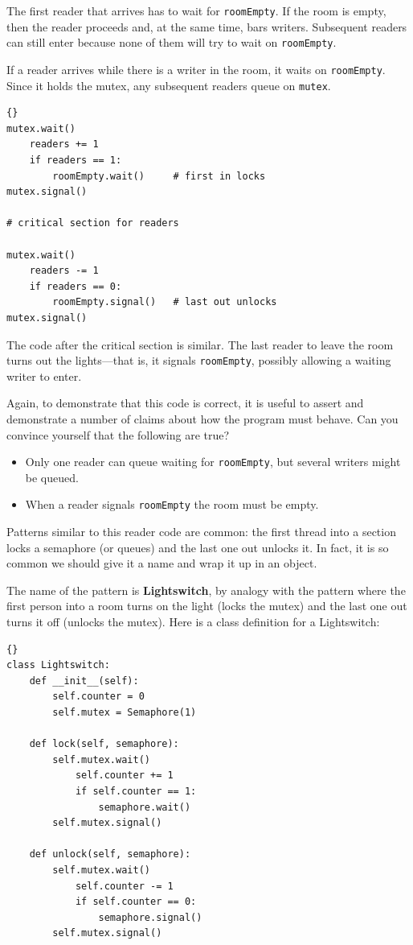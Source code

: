 \documentclass{book}
\begin{document}
The first reader that arrives has to wait for {\tt roomEmpty}.
If the room is empty, then the reader proceeds and, at the
same time, bars writers.  Subsequent readers can still enter
because none of them will try to wait on {\tt roomEmpty}.

If a reader arrives while there is a writer in the room,
it waits on {\tt roomEmpty}.  Since it holds the mutex, any
subsequent readers queue on {\tt mutex}.

\begin{lstlisting}[caption={Readers solution}]{}
mutex.wait()
    readers += 1
    if readers == 1:
        roomEmpty.wait()     # first in locks
mutex.signal()

# critical section for readers

mutex.wait()
    readers -= 1
    if readers == 0:
        roomEmpty.signal()   # last out unlocks
mutex.signal()
\end{lstlisting}

The code after the critical section is similar.  The last reader
to leave the room turns out the lights---that is, it signals
{\tt roomEmpty}, possibly allowing a waiting writer to enter.

Again, to demonstrate that this code is correct, it is useful
to assert and demonstrate a number of claims about how the program
must behave.  Can you convince yourself that the following are
true?

\begin{itemize}

\item Only one reader can queue waiting for {\tt roomEmpty},
but several writers might be queued.

\item When a reader signals {\tt roomEmpty} the room must
be empty.

\end{itemize}

Patterns similar to this reader code are common: the first thread into
a section locks a semaphore (or queues) and the last one out unlocks
it.  In fact, it is so common we should give it a name and wrap it up
in an object.

The name of the pattern is {\bf Lightswitch}, by analogy with the
pattern where the first person into a room turns on the light (locks
the mutex) and the last one out turns it off (unlocks the mutex).
Here is a class definition for a Lightswitch:

\begin{lstlisting}[caption={Lightswitch definition}]{}
class Lightswitch:
    def __init__(self):
        self.counter = 0
        self.mutex = Semaphore(1)

    def lock(self, semaphore):
        self.mutex.wait()
            self.counter += 1
            if self.counter == 1:
                semaphore.wait()
        self.mutex.signal()

    def unlock(self, semaphore):
        self.mutex.wait()
            self.counter -= 1
            if self.counter == 0:
                semaphore.signal()
        self.mutex.signal()
\end{lstlisting}
\end{document}

